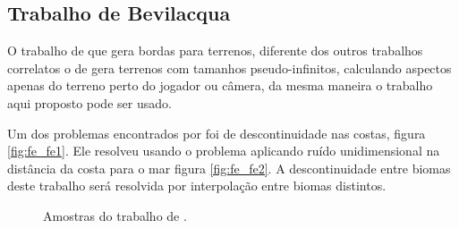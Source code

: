 \subsection{Trabalho de Bevilacqua}
O trabalho de \cite{fernando2009costas} que gera bordas para terrenos, diferente dos 
outros trabalhos correlatos o de \cite{fernando2009costas} gera terrenos com tamanhos
pseudo-infinitos, calculando aspectos apenas do terreno perto do jogador ou câmera, 
da mesma maneira o trabalho aqui proposto pode ser usado.

Um dos problemas encontrados por \cite{fernando2009costas} foi de descontinuidade %
nas costas, figura \ref{fig:fe_fe1}. Ele resolveu usando o problema aplicando ruído unidimensional na distância da costa
para o mar figura \ref{fig:fe_fe2}. A descontinuidade entre biomas deste trabalho será resolvida por interpolação 
entre biomas distintos.

\begin{figure}[H]
     \centering
     \hspace{0.1cm}
     \caption{Amostras do trabalho de \cite{fernando2009costas}.}
     \label{fig:fefefefefe}
\end{figure}